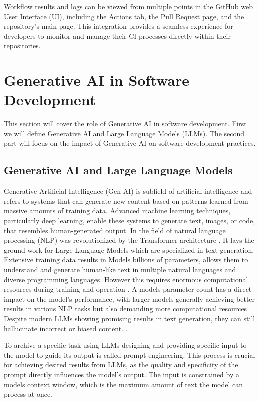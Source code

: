 Workflow results and logs can be viewed from multiple points in the GitHub web User Interface (UI), including the Actions tab, the Pull Request page, and the repository's main page. This integration provides a seamless experience for developers to monitor and manage their CI processes directly within their repositories.

\section{Generative AI in Software Development}

This section will cover the role of Generative AI in software development. First we will define Generative AI and Large Language Models (LLMs). The second part will focus on the impact of Generative AI on software development practices.

\subsection{Generative AI and Large Language Models}
Generative Artificial Intelligence (Gen AI) is subfield of artificial intelligence and refers to systems that can generate new content based on patterns learned from massive amounts of training data. Advanced machine learning techniques, particularly deep learning, enable these systems to generate text, images, or code, that resembles human-generated output.
In the field of natural language processing (NLP) was revolutionized by the Transformer architecture \cite{changSurveyEvaluationLarge2024}. It lays the ground work for Large Language Models which are specialized in text generation. Extensive training data results in Models billions of parameters, allows them to understand and generate human-like text in multiple natural languages and diverse programming languages. However this requires enormous computational resources during training and operation \cite{LLMsWhatsLarge}. A models parameter count has a direct impact on the model's performance, with larger models generally achieving better results in various NLP tasks but also demanding more computational resources %
Despite modern LLMs showing promising results in text generation, they can still hallucinate incorrect or biased content. \cite{LLMsWhatsLarge}.

To archive a specific task using LLMs designing and providing specific input to the model to guide its output is called prompt engineering. This process is crucial for achieving desired results from LLMs, as the quality and specificity of the prompt directly influences the model's output. The input is constrained by a models context window, which is the maximum amount of text the model can process at once.

